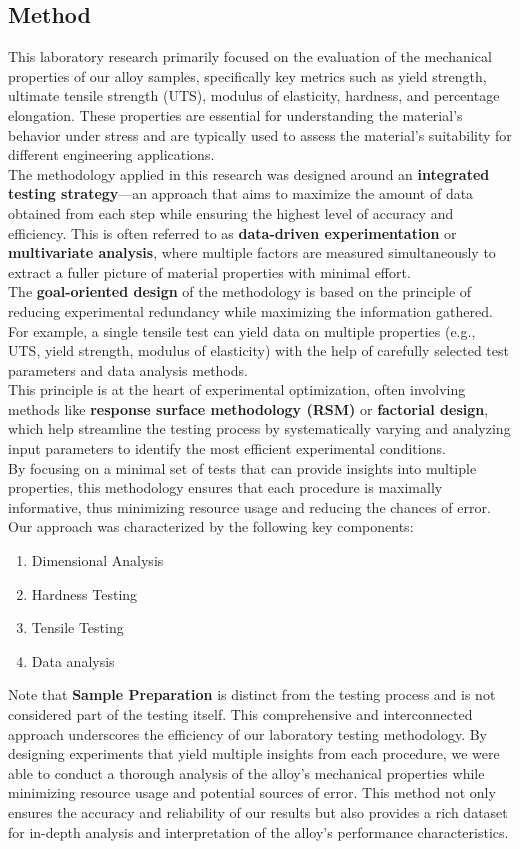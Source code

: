 \documentclass{article}
\begin{document}
\subsection{Method}
This laboratory research primarily focused on the evaluation of the mechanical properties of our alloy samples, specifically key metrics such as yield strength, ultimate tensile strength (UTS), modulus of elasticity, hardness, and percentage elongation. These properties are essential for understanding the material's behavior under stress and are typically used to assess the material’s suitability for different engineering applications.\\[8pt]
The methodology applied in this research was designed around an \textbf{integrated testing strategy}—an approach that aims to maximize the amount of data obtained from each step while ensuring the highest level of accuracy and efficiency. This is often referred to as \textbf{data-driven experimentation} or \textbf{multivariate analysis}, where multiple factors are measured simultaneously to extract a fuller picture of material properties with minimal effort.\\[8pt]
The \textbf{goal-oriented design} of the methodology is based on the principle of reducing experimental redundancy while maximizing the information gathered. For example, a single tensile test can yield data on multiple properties (e.g., UTS, yield strength, modulus of elasticity) with the help of carefully selected test parameters and data analysis methods.\\[8pt]
This principle is at the heart of experimental optimization, often involving methods like \textbf{response surface methodology (RSM)} or \textbf{factorial design}, which help streamline the testing process by systematically varying and analyzing input parameters to identify the most efficient experimental conditions.\\[8pt]
By focusing on a minimal set of tests that can provide insights into multiple properties, this methodology ensures that each procedure is maximally informative, thus minimizing resource usage and reducing the chances of error.\\[8pt]
Our approach was characterized by the following key components:
\begin{enumerate}[itemsep=-0.5mm]
    \item {Dimensional Analysis}
    \item {Hardness Testing}
    \item {Tensile Testing} 
    \item {Data analysis}
\end{enumerate}
Note that \textbf{Sample Preparation} is distinct from the testing process and is not considered part of the testing itself.
\newpage
\noindent 
This comprehensive and interconnected approach underscores the efficiency of our laboratory testing methodology. By designing experiments that yield multiple insights from each procedure, we were able to conduct a thorough analysis of the alloy's mechanical properties while minimizing resource usage and potential sources of error. This method not only ensures the accuracy and reliability of our results but also provides a rich dataset for in-depth analysis and interpretation of the alloy's performance characteristics.
\end{document}
